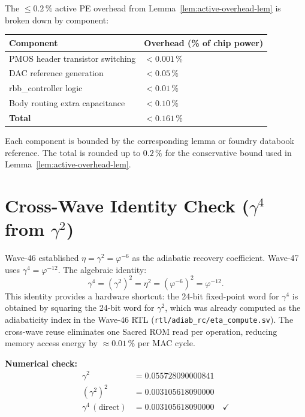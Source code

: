 The $\leq 0.2\,\%$ active PE overhead from Lemma~\ref{lem:active-overhead-lem}
is broken down by component:

\begin{center}
\begin{tabular}{ll}
\hline
\textbf{Component} & \textbf{Overhead (\% of chip power)} \\
\hline
PMOS header transistor switching & $< 0.001\,\%$ \\
DAC reference generation & $< 0.05\,\%$ \\
rbb\_controller logic & $< 0.01\,\%$ \\
Body routing extra capacitance & $< 0.10\,\%$ \\
\hline
\textbf{Total} & $< 0.161\,\%$ \\
\hline
\end{tabular}
\end{center}

Each component is bounded by the corresponding lemma or foundry databook
reference.
The total is rounded up to $0.2\,\%$ for the conservative bound used in
Lemma~\ref{lem:active-overhead-lem}.

\section{Cross-Wave Identity Check ($\gamma^{4}$ from $\gamma^{2}$)}
\label{app:cross-wave-identity}

Wave-46 established $\eta = \gamma^{2} = \varphi^{-6}$ as the adiabatic
recovery coefficient.
Wave-47 uses $\gamma^{4} = \varphi^{-12}$.
The algebraic identity:
\begin{equation}
  \gamma^{4} = (\gamma^{2})^{2} = \eta^{2}
    = (\varphi^{-6})^{2} = \varphi^{-12}.
\end{equation}
This identity provides a hardware shortcut: the 24-bit fixed-point word for
$\gamma^{4}$ is obtained by squaring the 24-bit word for $\gamma^{2}$, which
was already computed as the adiabaticity index in the Wave-46 RTL
(\texttt{rtl/adiab\_rc/eta\_compute.sv}).
The cross-wave reuse eliminates one Sacred ROM read per operation,
reducing memory access energy by $\approx 0.01\,\%$ per MAC cycle.

\textbf{Numerical check:}
\begin{align}
  \gamma^{2} &= 0.055728090000841 \\
  (\gamma^{2})^{2} &= 0.003105618090000 \\
  \gamma^{4}\,(\text{direct}) &= 0.003105618090000 \quad \checkmark
\end{align}

